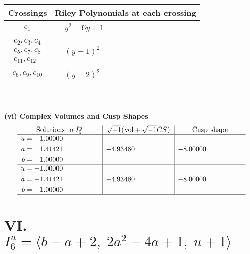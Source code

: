 \documentclass[1p]{elsarticle_modified}
\theoremstyle{definition}
\newcommand{\I}{\sqrt{-1}}
\begin{document}
\begin{tabular}{m{50pt}|m{274pt}}
Crossings & \hspace{64pt}Riley Polynomials at each crossing \\
\hline $$\begin{aligned}c_{1}\end{aligned}$$&$\begin{aligned}
&y^2-6 y+1
\end{aligned}$\\
\hline $$\begin{aligned}c_{2},c_{3},c_{4}\\c_{5},c_{7},c_{8}\\c_{11},c_{12}\end{aligned}$$&$\begin{aligned}
&(y-1)^2
\end{aligned}$\\
\hline $$\begin{aligned}c_{6},c_{9},c_{10}\end{aligned}$$&$\begin{aligned}
&(y-2)^2
\end{aligned}$\\
\hline
\end{tabular}\\~\\
\newpage\flushleft \textbf{(vi) Complex Volumes and Cusp Shapes}
$$\begin{array}{c|c|c}  
\text{Solutions to }I^u_{5}& \I (\text{vol} + \sqrt{-1}CS) & \text{Cusp shape}\\
 \hline 
\begin{aligned}
u &= -1.00000\phantom{ +0.000000I} \\
a &= \phantom{-}1.41421\phantom{ +0.000000I} \\
b &= \phantom{-}1.00000\phantom{ +0.000000I}\end{aligned}
 & -4.93480\phantom{ +0.000000I} & -8.00000\phantom{ +0.000000I} \\ \hline\begin{aligned}
u &= -1.00000\phantom{ +0.000000I} \\
a &= -1.41421\phantom{ +0.000000I} \\
b &= \phantom{-}1.00000\phantom{ +0.000000I}\end{aligned}
 & -4.93480\phantom{ +0.000000I} & -8.00000\phantom{ +0.000000I}\\
 \hline 
 \end{array}$$\newpage\newpage\renewcommand{\arraystretch}{1}
\centering \section*{VI. $I^u_{6}= \langle b- a+2,\;2 a^2-4 a+1,\;u+1 \rangle$}
\end{document}
